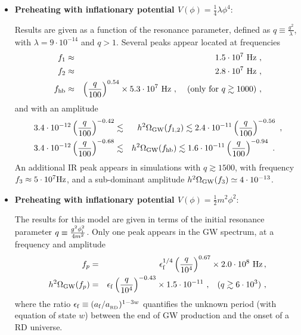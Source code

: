 \documentclass[a4paper,11pt]{article}
\newcommand{\bea}{\begin{eqnarray}}
\newcommand{\eea}{\end{eqnarray}}
\begin{document}
\begin{itemize}
\item \textbf{Preheating with inflationary potential $V (\phi) = \frac{1}{4} \lambda \phi^4$}:

Results are given as a function of the resonance parameter, defined as $q\equiv \frac{g^2}{\lambda}$, with $\lambda = 9 \cdot 10^{-14}$ and $q > 1$. Several peaks appear located at frequencies
\bea
f_1 &\approx & 1.5 \cdot 10^7 \ {\rm Hz} \ ,  \\
f_2 & \approx & 2.8 \cdot 10^7 \  {\rm Hz} \ , \\
 f_{\rm hb} &\approx  &   \left( \frac{q}{100} \right)^{0.54} \times 5.3 \cdot 10^7 \ {\rm Hz}  \ , \hspace{0.4cm} ({\rm only\,\,for\,\,} q \gtrsim 1000) \ ,
\eea
and with an amplitude
\bea   \label{eq:BoundedIRtodayPhi4v2}
  3.4 \cdot 10^{-12} \left( \frac{q}{100} \right)^{-0.42} &\lesssim & h^2 \Omega_{\rm GW} (f_{1,2}) \lesssim 2.4 \cdot 10^{-11}  \left( \frac{q}{100} \right)^{-0.56}  \ , \\
  \label{eq:BoundedHBtodayPhi4v2}
  3.4 \cdot 10^{-12}  \left( \frac{q}{100} \right)^{-0.68} & \lesssim & h^2 \Omega_{\rm GW} (f_{\rm hb}) \lesssim 1.6 \cdot 10^{-11}  \left( \frac{q}{100} \right)^{-0.94}  \ . \hspace{0.3cm} 
\eea 
An additional IR peak appears in simulations with $q \gtrsim 1500$, with frequency $f_3 \approx 5 \cdot 10^7 {\rm Hz}$, and a sub-dominant amplitude $h^2 \Omega_{\rm GW} (f_{3}) \simeq 4\cdot 10^{-13}$.

\item \textbf{Preheating with inflationary potential $V (\phi) = \frac{1}{2} m^2 \phi^2$}:

The results for this model are given in terms of the initial resonance parameter $q \equiv \frac{g^2 \phi_{\rm i}^2}{4 m^2}$. Only one peak appears in the GW spectrum, at a frequency and amplitude
\bea 
f_p &=&   \epsilon_{\rm f}^{1/4} \left( \frac{q}{10^4} \right)^{0.67} \times 2.0 \cdot 10^{8} \ {\rm Hz}\,, \\
h^2 \Omega_{\rm GW} (f_p) &=&  \epsilon_{\rm f}  \left( \frac{q}{10^4} \right)^{-0.43} \times 1.5 \cdot 10^{-11}   \ , \hspace{0.3cm} (q \gtrsim 6 \cdot 10^3 )   \ , \label{eq:m2phi2-finalfitv2}
\eea
where the ratio $\epsilon_{\rm f} \equiv (a_{\rm f} / a_{_{\rm RD}})^{1-3w}$ quantifies the unknown period (with equation of state $w$) between the end of GW production and the onset of a RD universe.




\end{itemize}
\end{document}
